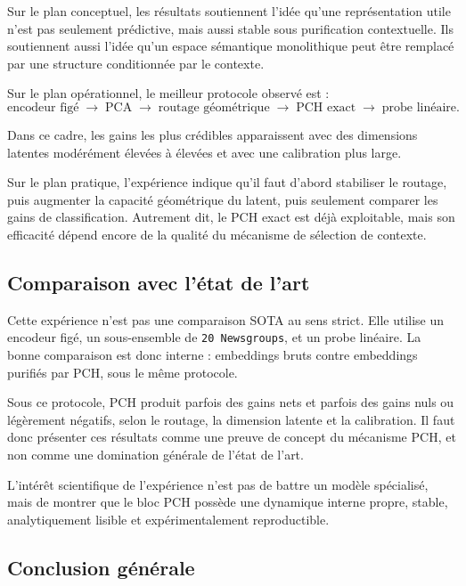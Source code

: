 \documentclass[11pt,a4paper]{article}
\newcommand{\1}{\mathbf 1}
\begin{document}
Sur le plan conceptuel, les résultats soutiennent l’idée qu’une représentation utile n’est pas seulement prédictive, mais aussi stable sous purification contextuelle. Ils soutiennent aussi l’idée qu’un espace sémantique monolithique peut être remplacé par une structure conditionnée par le contexte.

Sur le plan opérationnel, le meilleur protocole observé est :
\[
\text{encodeur figé}
\;\to\;
\text{PCA}
\;\to\;
\text{routage géométrique}
\;\to\;
\text{PCH exact}
\;\to\;
\text{probe linéaire}.
\]

Dans ce cadre, les gains les plus crédibles apparaissent avec des dimensions latentes modérément élevées à élevées et avec une calibration plus large.

Sur le plan pratique, l’expérience indique qu’il faut d’abord stabiliser le routage, puis augmenter la capacité géométrique du latent, puis seulement comparer les gains de classification. Autrement dit, le PCH exact est déjà exploitable, mais son efficacité dépend encore de la qualité du mécanisme de sélection de contexte.

\subsection{Comparaison avec l’état de l’art}

Cette expérience n’est pas une comparaison SOTA au sens strict. Elle utilise un encodeur figé, un sous-ensemble de \texttt{20 Newsgroups}, et un probe linéaire. La bonne comparaison est donc interne : embeddings bruts contre embeddings purifiés par PCH, sous le même protocole.

Sous ce protocole, PCH produit parfois des gains nets et parfois des gains nuls ou légèrement négatifs, selon le routage, la dimension latente et la calibration. Il faut donc présenter ces résultats comme une preuve de concept du mécanisme PCH, et non comme une domination générale de l’état de l’art.

L’intérêt scientifique de l’expérience n’est pas de battre un modèle spécialisé, mais de montrer que le bloc PCH possède une dynamique interne propre, stable, analytiquement lisible et expérimentalement reproductible.

\subsection{Conclusion générale}
\end{document}
